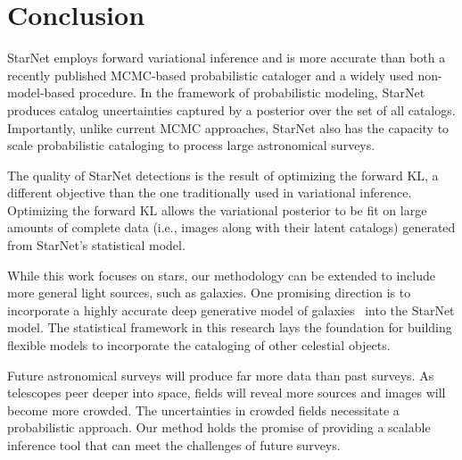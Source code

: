 \section{Conclusion}
\label{sec:conclusion}

StarNet employs forward variational inference and is more accurate than both a recently published MCMC-based probabilistic cataloger and a widely used non-model-based
procedure.
In the framework of probabilistic modeling,
StarNet produces catalog uncertainties captured by a posterior over the set of all catalogs.
Importantly, unlike current MCMC approaches, StarNet also has the capacity to scale probabilistic cataloging to process large astronomical surveys.

The quality of StarNet detections is the result of optimizing the forward KL, a different objective than the one traditionally used in variational inference.
Optimizing the forward KL allows the variational posterior to be fit on large amounts of complete data (i.e., images along with their latent catalogs) generated from StarNet's statistical model.

While this work focuses on stars, our methodology can be extended to
include more general light sources, such as galaxies.
One promising direction is to incorporate a highly accurate deep generative model of galaxies~\citep{Regier2015ADG, Reiman_2019_gans_deblend, lanusse2020deep, Arcelin_2020} into the StarNet model.
The statistical framework in this research lays the foundation for building flexible models to incorporate the cataloging of other celestial objects.

Future astronomical surveys will produce far more data than past surveys.
As telescopes peer deeper into space, fields will reveal more sources and images will become more crowded.
The uncertainties in crowded fields necessitate a probabilistic approach.
Our method holds the promise of providing  a scalable inference tool that can meet the challenges of future surveys.
